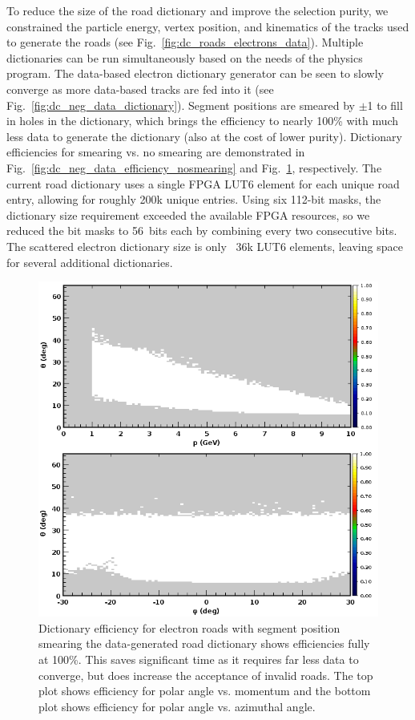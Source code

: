 To reduce the size of the road dictionary and improve the selection purity, we constrained the particle energy,
vertex position, and kinematics of the tracks used to generate the roads (see
Fig.~\ref{fig:dc_roads_electrons_data}). Multiple dictionaries can be run simultaneously based on the needs of
the physics program. The data-based electron dictionary generator can be seen to slowly converge as more
data-based tracks are fed into it (see Fig.~\ref{fig:dc_neg_data_dictionary}). Segment positions
are smeared by $\pm$1 to fill in holes in the dictionary, which brings the efficiency to nearly 100\% with much
less data to generate the dictionary (also at the cost of lower purity). Dictionary efficiencies for smearing vs.
no smearing are demonstrated in Fig.~\ref{fig:dc_neg_data_efficiency_nosmearing} and
Fig.~\ref{fig:dc_neg_data_efficiency_smearing}, respectively. The current road dictionary uses a single FPGA
LUT6 element for each unique road entry, allowing for roughly 200k unique entries. Using six 112-bit masks, the
dictionary size requirement exceeded the available FPGA resources, so we reduced the bit masks to 56~bits
each by combining every two consecutive bits. The scattered electron dictionary size is only ~36k LUT6 elements,
leaving space for several additional dictionaries.

\begin{figure}[hbt]
	\centering
	\includegraphics[width=1.0\columnwidth,keepaspectratio]{img/dc_neg_data_efficiency_smearing.png}
	\caption{Dictionary efficiency for electron roads with segment position smearing the data-generated road
          dictionary shows efficiencies fully at 100\%. This saves significant time as it requires far less data to
          converge, but does increase the acceptance of invalid roads. The top plot shows efficiency for polar angle
          vs. momentum and the bottom plot shows efficiency for polar angle vs. azimuthal angle.}
	\label{fig:dc_neg_data_efficiency_smearing}
\end{figure}

